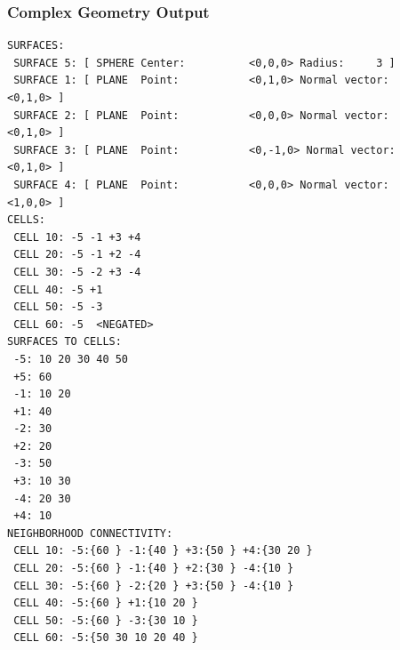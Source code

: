 \documentclass[color={usenames, dvipsnames},ignorenonframetext]{beamer}
\begin{document}
\begin{frame}[fragile]
\frametitle{Complex Geometry Output}
%

\begin{Verbatim}
SURFACES: 
 SURFACE 5: [ SPHERE Center:          <0,0,0> Radius:     3 ]
 SURFACE 1: [ PLANE  Point:           <0,1,0> Normal vector:          <0,1,0> ]
 SURFACE 2: [ PLANE  Point:           <0,0,0> Normal vector:          <0,1,0> ]
 SURFACE 3: [ PLANE  Point:           <0,-1,0> Normal vector:          <0,1,0> ]
 SURFACE 4: [ PLANE  Point:           <0,0,0> Normal vector:          <1,0,0> ]
CELLS: 
 CELL 10: -5 -1 +3 +4 
 CELL 20: -5 -1 +2 -4 
 CELL 30: -5 -2 +3 -4 
 CELL 40: -5 +1 
 CELL 50: -5 -3 
 CELL 60: -5  <NEGATED>
SURFACES TO CELLS: 
 -5: 10 20 30 40 50 
 +5: 60 
 -1: 10 20 
 +1: 40 
 -2: 30 
 +2: 20 
 -3: 50 
 +3: 10 30 
 -4: 20 30 
 +4: 10 
NEIGHBORHOOD CONNECTIVITY: 
 CELL 10: -5:{60 } -1:{40 } +3:{50 } +4:{30 20 } 
 CELL 20: -5:{60 } -1:{40 } +2:{30 } -4:{10 } 
 CELL 30: -5:{60 } -2:{20 } +3:{50 } -4:{10 } 
 CELL 40: -5:{60 } +1:{10 20 } 
 CELL 50: -5:{60 } -3:{30 10 } 
 CELL 60: -5:{50 30 10 20 40 } 
\end{Verbatim}
\end{frame}  

\end{document}
